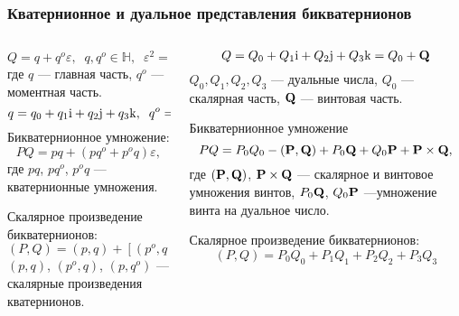 \begin{frame}
  \frametitle{Кватернионное и дуальное представления бикватернионов}
  \begin{columns}
    \begin{column}{0.5\textwidth}
      \begin{equation*}
        Q = q + q^o\varepsilon, \;\;
        q, q^o \in \mathbb{H},\;\;
        \varepsilon^2 = 0,\;\;
        \varepsilon \not = 0,
      \end{equation*}
      где $q$ --- главная часть, $q^o$ --- моментная часть.
      \begin{equation*}
        q = q_0 + q_1 \mathrm{i} + q_2 \mathrm{j} + q_3 \mathrm{k},\;\;
        q^o = q^o_0 + q^o_1 \mathrm{i} + q^o_2 \mathrm{j} + q^o_3 \mathrm{k}.
      \end{equation*}
      Бикватернионное умножение:
      \begin{equation*}
        PQ = pq + (pq^o + p^oq)\varepsilon,
      \end{equation*}
      где $pq$, $pq^o$, $p^oq$ --- кватернионные умножения.

      Скалярное произведение бикватернионов:
      \begin{equation*}
        (P, Q) = (p, q) + [(p^o, q) + (p, q^o)]\varepsilon,
      \end{equation*}
      $(p, q)$, $(p^o, q)$, $(p, q^o)$ --- скалярные произведения кватернионов.
    \end{column}
    \begin{column}{0.5\textwidth}
      \begin{equation*}
        Q = Q_0 + Q_1 \mathrm{i} + Q_2 \mathrm{j} + Q_3 \mathrm{k} = Q_0 + \vb{Q}
      \end{equation*}
      $Q_0, Q_1, Q_2, Q_3$ --- дуальные числа, $Q_0$ --- скалярная часть, $\vb{Q}$ --- винтовая часть.
      
      Бикватернионное умножение
      \begin{equation*}
        PQ = P_0Q_0 - (\vb{P}, \vb{Q}) + P_0 \vb{Q} + Q_0 \vb{P} + \vb{P}\times \vb{Q},
      \end{equation*}
      где $(\vb{P}, \vb{Q})$, $\vb{P}\times\vb{Q}$ --- скалярное и винтовое умножения винтов, $P_0 \vb{Q}$,  $Q_0 \vb{P}$ ---умножение винта на дуальное число.

      Скалярное произведение бикватернионов:
      \begin{equation*}
        (P, Q) = P_0Q_0 + P_1Q_1 + P_2Q_2 + P_3Q_3
      \end{equation*}
    \end{column}
  \end{columns}
\end{frame}

